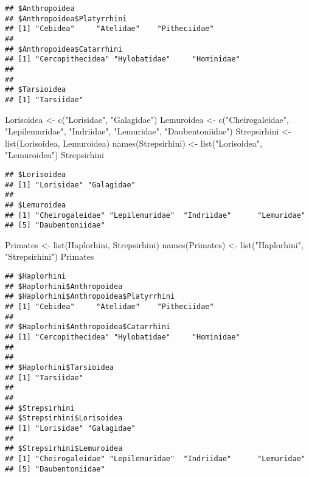 \documentclass[
]{article}
\newenvironment{Shaded}{\begin{snugshade}}{\end{snugshade}}
\newcommand{\FunctionTok}[1]{\textcolor[rgb]{0.00,0.00,0.00}{#1}}
\newcommand{\NormalTok}[1]{#1}
\newcommand{\OtherTok}[1]{\textcolor[rgb]{0.56,0.35,0.01}{#1}}
\newcommand{\StringTok}[1]{\textcolor[rgb]{0.31,0.60,0.02}{#1}}
\begin{document}
\begin{verbatim}
## $Anthropoidea
## $Anthropoidea$Platyrrhini
## [1] "Cebidea"     "Atelidae"    "Pitheciidae"
## 
## $Anthropoidea$Catarrhini
## [1] "Cercopithecidea" "Hylobatidae"     "Hominidae"      
## 
## 
## $Tarsioidea
## [1] "Tarsiidae"
\end{verbatim}

\begin{Shaded}
\begin{Highlighting}[]
\NormalTok{Lorisoidea }\OtherTok{\textless{}{-}} \FunctionTok{c}\NormalTok{(}\StringTok{"Lorisidae"}\NormalTok{, }\StringTok{"Galagidae"}\NormalTok{)}
\NormalTok{Lemuroidea }\OtherTok{\textless{}{-}} \FunctionTok{c}\NormalTok{(}\StringTok{"Cheirogaleidae"}\NormalTok{, }\StringTok{"Lepilemuridae"}\NormalTok{, }\StringTok{"Indriidae"}\NormalTok{, }\StringTok{"Lemuridae"}\NormalTok{, }\StringTok{"Daubentoniidae"}\NormalTok{)}
\NormalTok{Strepsirhini }\OtherTok{\textless{}{-}} \FunctionTok{list}\NormalTok{(Lorisoidea, Lemuroidea)}
\FunctionTok{names}\NormalTok{(Strepsirhini) }\OtherTok{\textless{}{-}} \FunctionTok{list}\NormalTok{(}\StringTok{"Lorisoidea"}\NormalTok{, }\StringTok{"Lemuroidea"}\NormalTok{)}
\NormalTok{Strepsirhini}
\end{Highlighting}
\end{Shaded}

\begin{verbatim}
## $Lorisoidea
## [1] "Lorisidae" "Galagidae"
## 
## $Lemuroidea
## [1] "Cheirogaleidae" "Lepilemuridae"  "Indriidae"      "Lemuridae"     
## [5] "Daubentoniidae"
\end{verbatim}

\begin{Shaded}
\begin{Highlighting}[]
\NormalTok{Primates }\OtherTok{\textless{}{-}} \FunctionTok{list}\NormalTok{(Haplorhini, Strepsirhini)}
\FunctionTok{names}\NormalTok{(Primates) }\OtherTok{\textless{}{-}} \FunctionTok{list}\NormalTok{(}\StringTok{"Haplorhini"}\NormalTok{, }\StringTok{"Strepsirhini"}\NormalTok{)}
\NormalTok{Primates}
\end{Highlighting}
\end{Shaded}

\begin{verbatim}
## $Haplorhini
## $Haplorhini$Anthropoidea
## $Haplorhini$Anthropoidea$Platyrrhini
## [1] "Cebidea"     "Atelidae"    "Pitheciidae"
## 
## $Haplorhini$Anthropoidea$Catarrhini
## [1] "Cercopithecidea" "Hylobatidae"     "Hominidae"      
## 
## 
## $Haplorhini$Tarsioidea
## [1] "Tarsiidae"
## 
## 
## $Strepsirhini
## $Strepsirhini$Lorisoidea
## [1] "Lorisidae" "Galagidae"
## 
## $Strepsirhini$Lemuroidea
## [1] "Cheirogaleidae" "Lepilemuridae"  "Indriidae"      "Lemuridae"     
## [5] "Daubentoniidae"
\end{verbatim}
\end{document}
